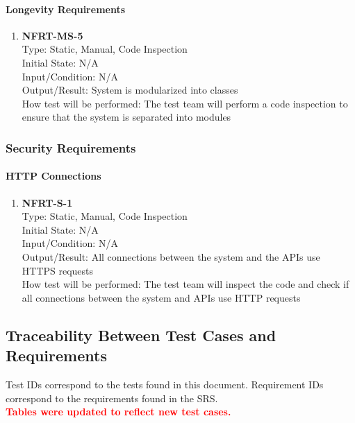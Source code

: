 \documentclass[12pt, titlepage]{article}
\begin{document}
\paragraph{Longevity Requirements}
\begin{enumerate}
    \item{\textbf{NFRT-MS-5}}\\
    Type: Static, Manual, Code Inspection\\
    Initial State: N/A\\
    Input/Condition: N/A\\
    Output/Result: System is modularized into classes\\
    How test will be performed: The test team will perform a code inspection to ensure that the system is separated into modules
\end{enumerate}

\subsubsection{Security Requirements}
\paragraph{HTTP Connections}
\begin{enumerate}
    \item{\textbf{NFRT-S-1}}\\
    Type: Static, Manual, Code Inspection\\
    Initial State: N/A\\
    Input/Condition: N/A\\
    Output/Result: All connections between the system and the APIs use HTTPS requests\\
    How test will be performed: The test team will inspect the code and check if all connections between the system and APIs use HTTP requests
\end{enumerate}

\newpage

\subsection{Traceability Between Test Cases and Requirements}
\noindent Test IDs correspond to the tests found in this document. Requirement IDs correspond to the requirements found in the SRS. \\
\textcolor{red}{\textbf{Tables were updated to reflect new test cases.}}
\end{document}
